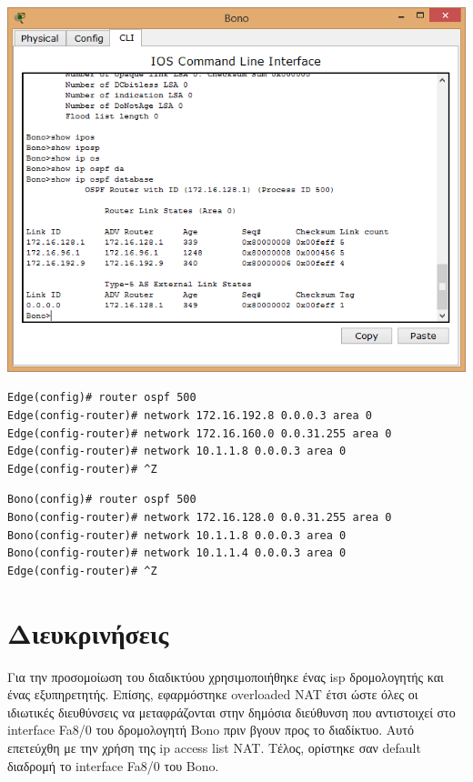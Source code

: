 \documentclass{assignment}
\begin{document}
\begin{center}
\includegraphics[width=\textwidth, height=\textheight, keepaspectratio]{images/ipospfdb.png}
\end{center}

\begin{verbatim}
Edge(config)# router ospf 500
Edge(config-router)# network 172.16.192.8 0.0.0.3 area 0
Edge(config-router)# network 172.16.160.0 0.0.31.255 area 0
Edge(config-router)# network 10.1.1.8 0.0.0.3 area 0
Edge(config-router)# ^Z
\end{verbatim}

\begin{verbatim}
Bono(config)# router ospf 500
Bono(config-router)# network 172.16.128.0 0.0.31.255 area 0
Bono(config-router)# network 10.1.1.8 0.0.0.3 area 0
Bono(config-router)# network 10.1.1.4 0.0.0.3 area 0
Edge(config-router)# ^Z
\end{verbatim}

\section{Διευκρινήσεις}
Για την προσομοίωση του διαδικτύου χρησιμοποιήθηκε ένας isp δρομολογητής
και ένας εξυπηρετητής. Επίσης, εφαρμόστηκε overloaded NAT έτσι ώστε όλες οι ιδιωτικές
διευθύνσεις να μεταφράζονται στην δημόσια διεύθυνση που αντιστοιχεί στο
interface Fa8/0 του δρομολογητή Bono πριν βγουν προς το διαδίκτυο. Αυτό επετεύχθη με την χρήση της ip access list NAT. Τέλος, ορίστηκε σαν default διαδρομή
το interface Fa8/0 του Bono.
%
%

\newpage
\end{document}
